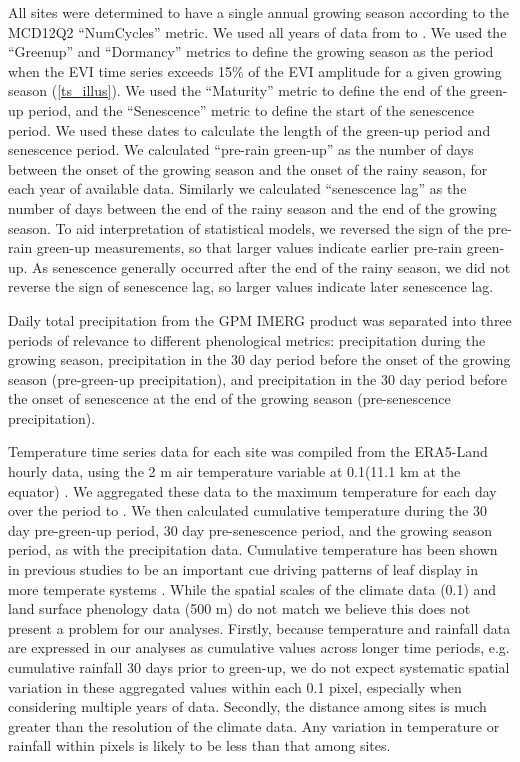 \documentclass[11pt,a4paper]{article}
\begin{document}
All sites were determined to have a single annual growing season according to
the MCD12Q2 ``NumCycles'' metric. We used all years of data from \modisStart{}
to \modisEnd{}. We used the ``Greenup'' and ``Dormancy'' metrics to define the
growing season as the period when the EVI time series exceeds 15\% of the EVI
amplitude for a given growing season (\autoref{ts_illus}). We used the
``Maturity'' metric to define the end of the green-up period, and the
``Senescence'' metric to define the start of the senescence period. We used
these dates to calculate the length of the green-up period and senescence
period. We calculated ``pre-rain green-up'' as the number of days between the
onset of the growing season and the onset of the rainy season, for each year of
available data. Similarly we calculated ``senescence lag'' as the number of
days between the end of the rainy season and the end of the growing season. To
aid interpretation of statistical models, we reversed the sign of the pre-rain
green-up measurements, so that larger values indicate earlier pre-rain
green-up. As senescence generally occurred after the end of the rainy season,
we did not reverse the sign of senescence lag, so larger values indicate later
senescence lag. 

Daily total precipitation from the GPM IMERG product was separated into three
periods of relevance to different phenological metrics: precipitation during
the growing season, precipitation in the 30 day period before the onset of the
growing season (pre-green-up precipitation), and precipitation in the 30 day
period before the onset of senescence at the end of the growing season
(pre-senescence precipitation). 

Temperature time series data for each site was compiled from the ERA5-Land
hourly data, using the 2 m air temperature variable at 0.1\textdegree (11.1 km
at the equator) \citep{ERA5}. We aggregated these data to the maximum
temperature for each day over the period \modisStart{} to \modisEnd{}. We then
calculated cumulative temperature during the 30 day pre-green-up period, 30 day
pre-senescence period, and the growing season period, as with the precipitation
data. Cumulative temperature has been shown in previous studies to be an
important cue driving patterns of leaf display in more temperate systems
\citep{Archibald2007, Michelson2017, Escamilla2020}. While the spatial scales
of the climate data (0.1\textdegree{}) and land surface phenology data (500 m)
do not match we believe this does not present a problem for our analyses.
Firstly, because temperature and rainfall data are expressed in our analyses as
cumulative values across longer time periods, e.g. cumulative rainfall 30 days
prior to green-up, we do not expect systematic spatial variation in these
aggregated values within each 0.1\textdegree{} pixel, especially when
considering multiple years of data. Secondly, the distance among sites is much
greater than the resolution of the climate data. Any variation in temperature
or rainfall within pixels is likely to be less than that among sites.
\end{document}
